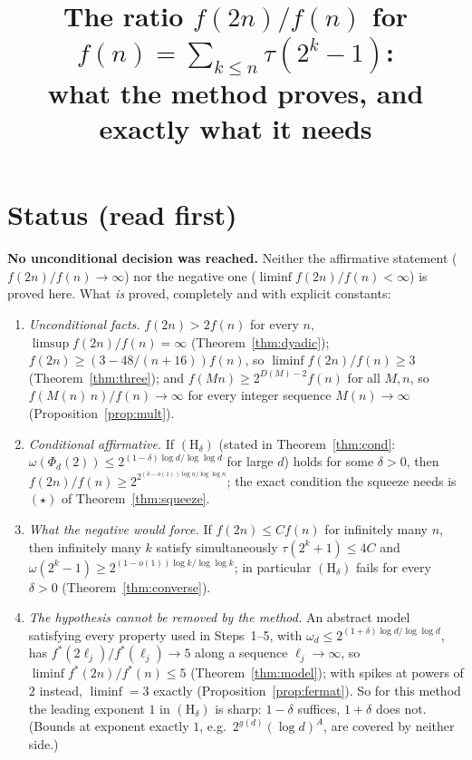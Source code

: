 \documentclass[11pt]{article}
\title{The ratio $f(2n)/f(n)$ for $f(n)=\sum_{k\le n}\tau(2^k-1)$:\\
what the method proves, and exactly what it needs}
\date{}
\theoremstyle{remark}
\begin{document}
\maketitle

\section*{Status (read first)}

\textbf{No unconditional decision was reached.} Neither the affirmative statement
($f(2n)/f(n)\to\infty$) nor the negative one ($\liminf f(2n)/f(n)<\infty$) is proved here.
What \emph{is} proved, completely and with explicit constants:

\begin{enumerate}
\item[(A)] \emph{Unconditional facts.} $f(2n)>2f(n)$ for every $n$, $\limsup f(2n)/f(n)=\infty$
  (Theorem~\ref{thm:dyadic}); $f(2n)\ge(3-48/(n+16))f(n)$, so $\liminf f(2n)/f(n)\ge3$
  (Theorem~\ref{thm:three}); and $f(Mn)\ge2^{D(M)-2}f(n)$ for all $M,n$, so
  $f(M(n)\,n)/f(n)\to\infty$ for every integer sequence $M(n)\to\infty$ (Proposition~\ref{prop:mult}).
\item[(B)] \emph{Conditional affirmative.} If $(\mathrm{H}_\delta)$ (stated in
  Theorem~\ref{thm:cond}: $\omega(\Phi_d(2))\le2^{(1-\delta)\log d/\log\log d}$ for large $d$) holds
  for some $\delta>0$, then
  $f(2n)/f(n)\ge 2^{2^{(\delta-o(1))\log n/\log\log n}}$; the exact condition the squeeze needs is
  $(\star)$ of Theorem~\ref{thm:squeeze}.
\item[(C)] \emph{What the negative would force.} If $f(2n)\le Cf(n)$ for infinitely many $n$, then
  infinitely many $k$ satisfy simultaneously $\tau(2^k+1)\le 4C$ and
  $\omega(2^k-1)\ge 2^{(1-o(1))\log k/\log\log k}$; in particular $(\mathrm H_\delta)$ fails for
  every $\delta>0$ (Theorem~\ref{thm:converse}).
\item[(D)] \emph{The hypothesis cannot be removed by the method.} An abstract model satisfying every
  property used in Steps~1--5, with $\omega_d\le 2^{(1+\delta)\log d/\log\log d}$, has
  $f^*(2\ell_j)/f^*(\ell_j)\to 5$ along a sequence $\ell_j\to\infty$, so $\liminf f^*(2n)/f^*(n)\le 5$
  (Theorem~\ref{thm:model}); with spikes at powers of $2$ instead, $\liminf=3$ exactly
  (Proposition~\ref{prop:fermat}). So for this method the leading exponent $1$ in
  $(\mathrm H_\delta)$ is sharp: $1-\delta$ suffices, $1+\delta$ does not. (Bounds at exponent
  exactly $1$, e.g.\ $2^{g(d)}(\log d)^A$, are covered by neither side.)
\end{enumerate}
\end{document}
